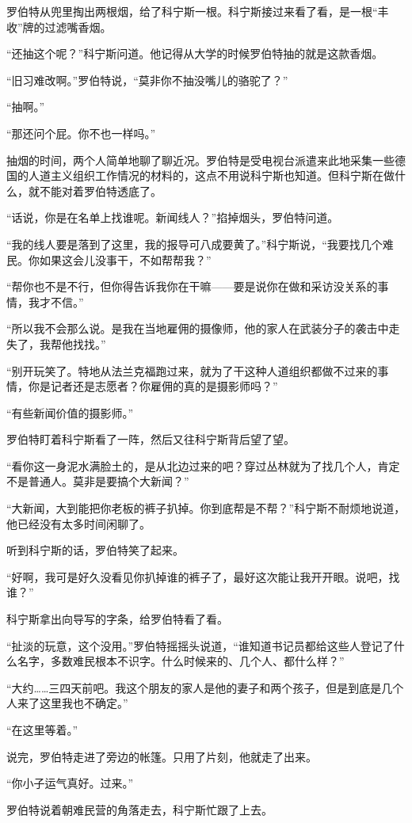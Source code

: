 罗伯特从兜里掏出两根烟，给了科宁斯一根。科宁斯接过来看了看，是一根“丰收”牌的过滤嘴香烟。

“还抽这个呢？”科宁斯问道。他记得从大学的时候罗伯特抽的就是这款香烟。

“旧习难改啊。”罗伯特说，“莫非你不抽没嘴儿的骆驼了？”

“抽啊。”

“那还问个屁。你不也一样吗。”

抽烟的时间，两个人简单地聊了聊近况。罗伯特是受电视台派遣来此地采集一些德国的人道主义组织工作情况的材料的，这点不用说科宁斯也知道。但科宁斯在做什么，就不能对着罗伯特透底了。

“话说，你是在名单上找谁呢。新闻线人？”掐掉烟头，罗伯特问道。

“我的线人要是落到了这里，我的报导可八成要黄了。”科宁斯说，“我要找几个难民。你如果这会儿没事干，不如帮帮我？”

“帮你也不是不行，但你得告诉我你在干嘛——要是说你在做和采访没关系的事情，我才不信。”

“所以我不会那么说。是我在当地雇佣的摄像师，他的家人在武装分子的袭击中走失了，我帮他找找。”

“别开玩笑了。特地从法兰克福跑过来，就为了干这种人道组织都做不过来的事情，你是记者还是志愿者？你雇佣的真的是摄影师吗？”

“有些新闻价值的摄影师。”

罗伯特盯着科宁斯看了一阵，然后又往科宁斯背后望了望。

“看你这一身泥水满脸土的，是从北边过来的吧？穿过丛林就为了找几个人，肯定不是普通人。莫非是要搞个大新闻？”

“大新闻，大到能把你老板的裤子扒掉。你到底帮是不帮？”科宁斯不耐烦地说道，他已经没有太多时间闲聊了。

听到科宁斯的话，罗伯特笑了起来。

“好啊，我可是好久没看见你扒掉谁的裤子了，最好这次能让我开开眼。说吧，找谁？”

科宁斯拿出向导写的字条，给罗伯特看了看。

“扯淡的玩意，这个没用。”罗伯特摇摇头说道，“谁知道书记员都给这些人登记了什么名字，多数难民根本不识字。什么时候来的、几个人、都什么样？”

“大约……三四天前吧。我这个朋友的家人是他的妻子和两个孩子，但是到底是几个人来了这里我也不确定。”

“在这里等着。”

说完，罗伯特走进了旁边的帐篷。只用了片刻，他就走了出来。

“你小子运气真好。过来。”

罗伯特说着朝难民营的角落走去，科宁斯忙跟了上去。

